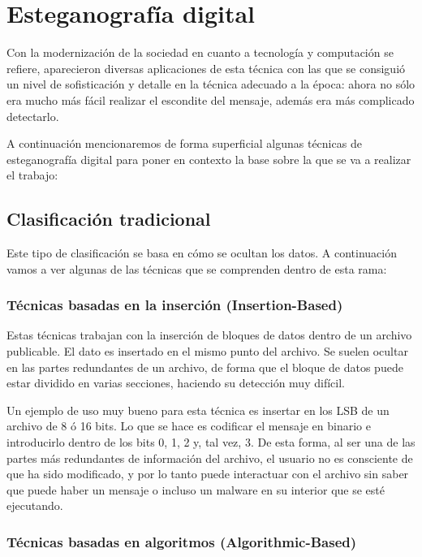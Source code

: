 \section{Esteganografía digital}

Con la modernización de la sociedad en cuanto a tecnología y computación se refiere, aparecieron diversas aplicaciones de esta técnica con las que se consiguió un nivel de sofisticación y detalle en la técnica adecuado a la época: ahora no sólo era mucho más fácil realizar el escondite del mensaje, además era más complicado detectarlo. %

A continuación mencionaremos de forma superficial algunas técnicas  de esteganografía digital para poner en contexto la base sobre la que se va a realizar el trabajo:

\subsection{Clasificación tradicional}
\label{sec:trad}

Este tipo de clasificación se basa en cómo se ocultan los datos. A continuación vamos a ver algunas de las técnicas que se comprenden dentro de esta rama:

\subsubsection{Técnicas basadas en la inserción (Insertion-Based)}

Estas técnicas trabajan con la inserción de bloques de datos dentro de un archivo publicable. El dato es insertado en el mismo punto del archivo. Se suelen ocultar en las partes redundantes de un archivo, de forma que el bloque de datos puede estar dividido en varias secciones, haciendo su detección muy difícil.%

Un ejemplo de uso muy bueno para esta técnica es insertar en los \ac{LSB} de un archivo de 8 ó 16 bits. Lo que se hace es codificar el mensaje en binario e introducirlo dentro de los bits 0, 1, 2 y, tal vez, 3. De esta forma, al ser una de las partes más redundantes de información del archivo, el usuario no es consciente de que ha sido modificado, y por lo tanto puede interactuar con el archivo sin saber que puede haber un mensaje o incluso un malware en su interior que se esté ejecutando.

\subsubsection{Técnicas basadas en algoritmos (Algorithmic-Based)} 

